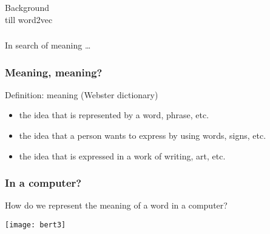 \begin{frame}[fragile]\frametitle{}
\begin{center}
{\Large Background}\\

{till word2vec}

\end{center}
\end{frame}

\begin{frame}[fragile]\frametitle{}
\begin{center}
{\Large In search of meaning \ldots}

\end{center}
\end{frame}

\begin{frame}[fragile]\frametitle{Meaning, meaning?}
Definition: meaning (Webster dictionary)

\begin{itemize}
\item the idea that is represented by a word, phrase, etc.
\item the idea that a person wants to express by using  words, signs, etc.
\item the idea that is expressed in a work of writing, art, etc.  
\end{itemize}




\end{frame}


\begin{frame}[fragile]\frametitle{In a computer?}

How do we represent the meaning of a word in a computer?

\begin{center}
\texttt{[image: bert3]}
\end{center}		  


\end{frame}

